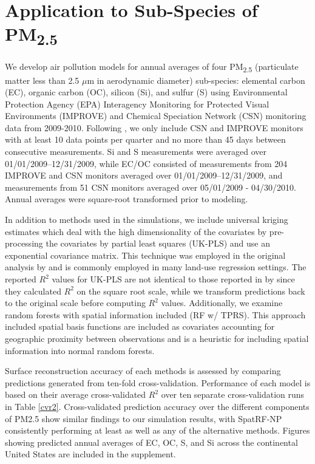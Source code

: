 \documentclass[12pt]{article}
\begin{document}
\section{Application to Sub-Species of PM\textsubscript{2.5}}

We develop air pollution models for annual averages of four PM\textsubscript{2.5} (particulate matter less than 2.5 $\mu$m in aerodynamic diameter) sub-species: elemental carbon (EC), organic carbon (OC), silicon (Si), and sulfur (S) using Environmental Protection Agency (EPA) Interagency Monitoring for Protected Visual Environments (IMPROVE) and Chemical Speciation Network (CSN) monitoring data from 2009-2010. Following \cite{bergen2013national}, we only include CSN and IMPROVE monitors with at least 10 data points per quarter and no more than 45 days between consecutive measurements. Si and S measurements were averaged over 01/01/2009–12/31/2009, while EC/OC consisted of measurements from 204 IMPROVE and CSN monitors averaged over 01/01/2009–12/31/2009, and measurements from 51 CSN monitors averaged over 05/01/2009 - 04/30/2010. Annual averages were square-root transformed prior to modeling. 

In addition to methods used in the simulations, we include universal kriging estimates which deal with the high dimensionality of the covariates by pre-processing the covariates by partial least squares (UK-PLS) and use an exponential covariance matrix. This technique was employed in the original analysis by \cite{bergen2013national} and is commonly employed in many land-use regression settings. The reported $R^2$ values for UK-PLS are not identical to those reported in by \cite{bergen2013national} since they calculated $R^2$ on the square root scale, while we transform predictions back to the original scale before computing $R^2$ values. Additionally, we examine random forests with spatial information included (RF w/ TPRS). This approach included spatial basis functions are included as covariates accounting for geographic proximity between observations and is a heuristic for including spatial information into normal random forests. 

Surface reconstruction accuracy of each methods is assessed by comparing predictions generated from ten-fold cross-validation. Performance of each model is based on their average cross-validated $R^2$ over ten separate cross-validation runs in Table \ref{cvr2}. Cross-validated prediction accuracy over the different components of PM2.5 show similar findings to our simulation results, with SpatRF-NP consistently performing at least as well as any of the alternative methods. Figures showing predicted annual averages of EC, OC, S, and Si across the continental United States are included in the supplement.
\end{document}
